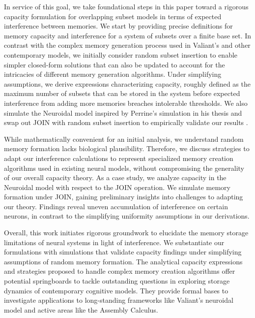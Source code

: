 In service of this goal, we take foundational steps in this paper toward a rigorous capacity formulation for overlapping subset models in terms of expected interference between memories. We start by providing precise definitions for memory capacity and interference for a system of subsets over a finite base set. In contrast with the complex memory generation process used in Valiant's and other contemporary models, we initially consider random subset insertion to enable simpler closed-form solutions that can also be updated to account for the intricacies of different memory generation algorithms. Under simplifying assumptions, we derive expressions characterizing capacity, roughly defined as the maximum number of subsets that can be stored in the system before expected interference from adding more memories breaches intolerable thresholds. We also simulate the Neuroidal model inspired by Perrine's simulation in his thesis and swap out JOIN with random subset insertion to empirically validate our results \cite{perrine2023neural}. 

While mathematically convenient for an initial analysis, we understand random memory formation lacks biological plausibility. Therefore, we discuss strategies to adapt our interference calculations to represent specialized memory creation algorithms used in existing neural models, without compromising the generality of our overall capacity theory. As a case study, we analyze capacity in the Neuroidal model with respect to the JOIN operation. We simulate memory formation under JOIN, gaining preliminary insights into challenges to adapting our theory. Findings reveal uneven accumulation of interference on certain neurons, in contrast to the simplifying uniformity assumptions in our derivations.

Overall, this work initiates rigorous groundwork to elucidate the memory storage limitations of neural systems in light of interference. We substantiate our formulations with simulations that validate capacity findings under simplifying assumptions of random memory formation. The analytical capacity expressions and strategies proposed to handle complex memory creation algorithms offer potential springboards to tackle outstanding questions in exploring storage dynamics of contemporary cognitive models. They provide formal bases to investigate applications to long-standing frameworks like Valiant's neuroidal model and active areas like the Assembly Calculus.